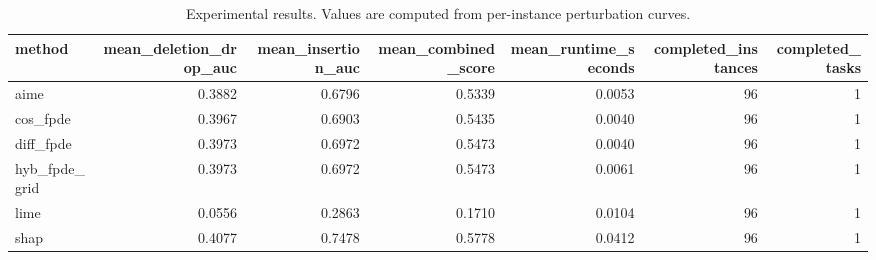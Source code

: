 \begin{table}[t]
\caption{Experimental results. Values are computed from per-instance perturbation curves.}
\label{tab:main_results_computed}
\centering
\begin{tabular}{lrrrrrr}
\toprule
method & mean\_deletion\_drop\_auc & mean\_insertion\_auc & mean\_combined\_score & mean\_runtime\_seconds & completed\_instances & completed\_tasks \\
\midrule
aime & 0.3882 & 0.6796 & 0.5339 & 0.0053 & 96 & 1 \\
cos\_fpde & 0.3967 & 0.6903 & 0.5435 & 0.0040 & 96 & 1 \\
diff\_fpde & 0.3973 & 0.6972 & 0.5473 & 0.0040 & 96 & 1 \\
hyb\_fpde\_grid & 0.3973 & 0.6972 & 0.5473 & 0.0061 & 96 & 1 \\
lime & 0.0556 & 0.2863 & 0.1710 & 0.0104 & 96 & 1 \\
shap & 0.4077 & 0.7478 & 0.5778 & 0.0412 & 96 & 1 \\
\bottomrule
\end{tabular}

\end{table}
